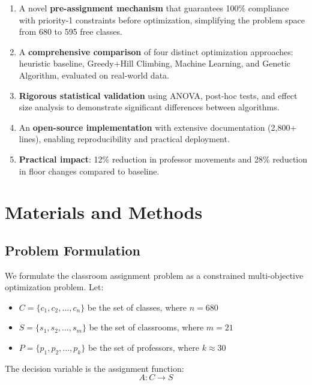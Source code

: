 \documentclass[12pt,a4paper]{article}
\begin{document}
\begin{enumerate}
\item A novel \textbf{pre-assignment mechanism} that guarantees 100\% compliance with priority-1 constraints before optimization, simplifying the problem space from 680 to 595 free classes.

\item A \textbf{comprehensive comparison} of four distinct optimization approaches: heuristic baseline, Greedy+Hill Climbing, Machine Learning, and Genetic Algorithm, evaluated on real-world data.

\item \textbf{Rigorous statistical validation} using ANOVA, post-hoc tests, and effect size analysis to demonstrate significant differences between algorithms.

\item An \textbf{open-source implementation} with extensive documentation (2,800+ lines), enabling reproducibility and practical deployment.

\item \textbf{Practical impact}: 12\% reduction in professor movements and 28\% reduction in floor changes compared to baseline.
\end{enumerate}

\section{Materials and Methods}

\subsection{Problem Formulation}

We formulate the classroom assignment problem as a constrained multi-objective optimization problem. Let:

\begin{itemize}
\item $C = \{c_1, c_2, \ldots, c_n\}$ be the set of classes, where $n = 680$
\item $S = \{s_1, s_2, \ldots, s_m\}$ be the set of classrooms, where $m = 21$
\item $P = \{p_1, p_2, \ldots, p_k\}$ be the set of professors, where $k \approx 30$
\end{itemize}

The decision variable is the assignment function:
\begin{equation}
A: C \rightarrow S
\end{equation}
\end{document}
